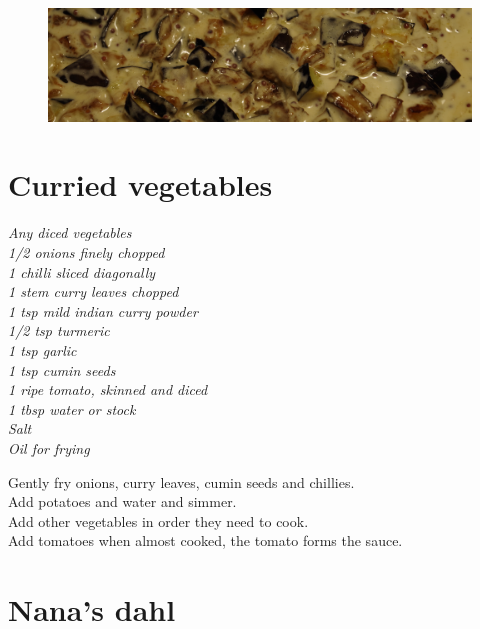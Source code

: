 \documentclass{tufte-book}
\begin{document}
\begin{figure}
  \includegraphics{eggplantcurry.png}
\end{figure}


\section{Curried vegetables}

\emph{Any diced vegetables
\\1/2 onions finely chopped
\\1 chilli sliced diagonally
\\1 stem curry leaves chopped
\\1 tsp mild indian curry powder
\\1/2 tsp turmeric
\\1 tsp garlic
\\1 tsp cumin seeds
\\1 ripe tomato, skinned and diced
\\1 tbsp water or stock
\\Salt
\\Oil for frying}

\smallskip
Gently fry onions, curry leaves, cumin seeds and chillies.
\\Add potatoes and water and simmer.
\\Add other vegetables in order they need to cook.
\\Add tomatoes when almost cooked, the tomato forms the sauce.


\section{Nana's dahl}
\end{document}
